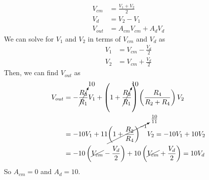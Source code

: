 \documentclass{article}
\begin{document}
\begin{align}
    V_{cm} &= \frac{V_1 + V_2}{2} \\
    V_d &= V_2 - V_1 \\
    V_{out} &= A_{cm} V_{cm} + A_d V_d
\end{align}
We can solve for \(V_1\) and \(V_2\) in terms of \(V_{cm}\) and \(V_d\) as
\begin{align}
    V_1 &= V_{cm} - \frac{V_d}{2} \\
    V_2 &= V_{cm} + \frac{V_d}{2}
\end{align}
Then, we can find \(V_{out}\) as
\begin{align}
    V_{out} &= -\cancelto{10}{\frac{R_3}{R_1}} V_1 + \left(1 + \cancelto{10}{\frac{R_3}{R_1}}\right) \left(\frac{R_4}{R_2 + R_4}\right) V_2 \\
            &= -10 V_1 + 11 \cancelto{\frac{10}{11}}{\left(1 + \frac{R_2}{R_4}\right)^{-1}} V_2 = -10 V_1 + 10 V_2 \\
            &= -10 \left(\cancel{V_{cm}} - \frac{V_d}{2}\right) + 10 \left(\cancel{V_{cm}} + \frac{V_d}{2}\right) = 10 V_d
\end{align}
So \(A_{cm} = 0\) and \(A_d = 10\).
\end{document}
